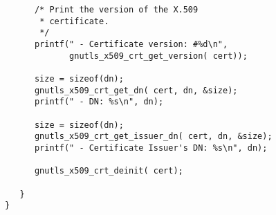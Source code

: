 \begin{verbatim}
      /* Print the version of the X.509 
       * certificate.
       */
      printf(" - Certificate version: #%d\n",
             gnutls_x509_crt_get_version( cert));

      size = sizeof(dn);
      gnutls_x509_crt_get_dn( cert, dn, &size);
      printf(" - DN: %s\n", dn);

      size = sizeof(dn);
      gnutls_x509_crt_get_issuer_dn( cert, dn, &size);
      printf(" - Certificate Issuer's DN: %s\n", dn);

      gnutls_x509_crt_deinit( cert);

   }
}

\end{verbatim}
